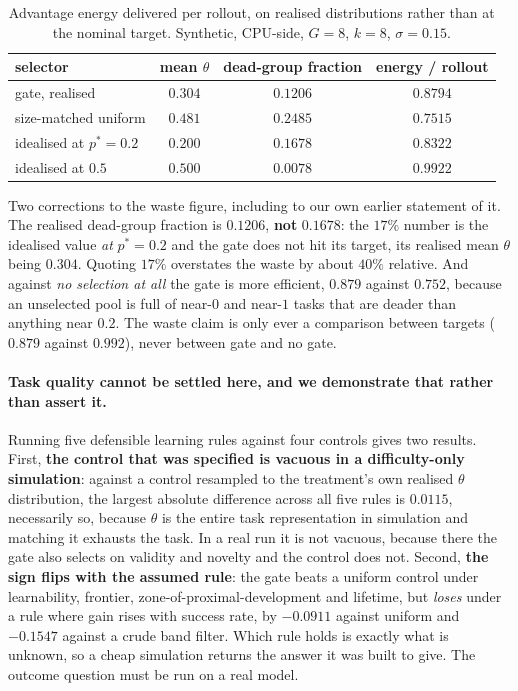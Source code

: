 \begin{table}[t]
\centering\small
\caption{Advantage energy delivered per rollout, on realised distributions rather than at
the nominal target. Synthetic, CPU-side, $G=8$, $k=8$, $\sigma=0.15$.}
\label{tab:gatebudget}
\begin{tabular}{lccc}
\toprule
selector & mean $\theta$ & dead-group fraction & energy / rollout \\
\midrule
gate, realised            & $0.304$ & $0.1206$ & $\mathbf{0.8794}$ \\
size-matched uniform      & $0.481$ & $0.2485$ & $0.7515$ \\
idealised at $p^*=0.2$    & $0.200$ & $0.1678$ & $0.8322$ \\
idealised at $0.5$        & $0.500$ & $0.0078$ & $0.9922$ \\
\bottomrule
\end{tabular}
\end{table}

Two corrections to the waste figure, including to our own earlier statement of it. The
realised dead-group fraction is $0.1206$, \textbf{not} $0.1678$: the $17\%$ number is the
idealised value \emph{at} $p^*=0.2$ and the gate does not hit its target, its realised mean
$\theta$ being $0.304$. Quoting $17\%$ overstates the waste by about $40\%$ relative. And
against \emph{no selection at all} the gate is more efficient, $0.879$ against $0.752$,
because an unselected pool is full of near-$0$ and near-$1$ tasks that are deader than
anything near $0.2$. The waste claim is only ever a comparison between targets ($0.879$
against $0.992$), never between gate and no gate.

\paragraph{Task quality cannot be settled here, and we demonstrate that rather than assert
it.} Running five defensible learning rules against four controls gives two results. First,
\textbf{the control that was specified is vacuous in a difficulty-only simulation}: against
a control resampled to the treatment's own realised $\theta$ distribution, the largest
absolute difference across all five rules is $0.0115$, necessarily so, because $\theta$ is
the entire task representation in simulation and matching it exhausts the task. In a real
run it is not vacuous, because there the gate also selects on validity and novelty and the
control does not. Second, \textbf{the sign flips with the assumed rule}: the gate beats a
uniform control under learnability, frontier, zone-of-proximal-development and lifetime, but
\emph{loses} under a rule where gain rises with success rate, by $-0.0911$ against uniform
and $-0.1547$ against a crude band filter. Which rule holds is exactly what is unknown, so a
cheap simulation returns the answer it was built to give. The outcome question must be run
on a real model.

